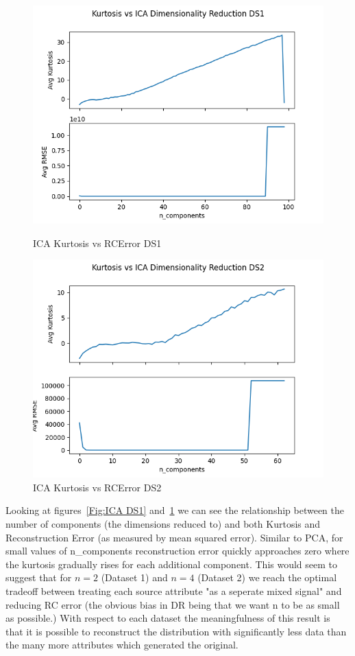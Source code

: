 \begin{figure}
    \begin{minipage}{0.5\textwidth}
        \centering
        \includegraphics[width=.9\linewidth]{icads1.png}
        \caption{ICA Kurtosis vs RCError DS1}\label{Fig:ICA DS1}
    \end{minipage}\hfill
    \begin{minipage}{0.5\textwidth}
        \centering
        \includegraphics[width=.9\linewidth]{icads2.png}
        \caption{ICA Kurtosis vs RCError DS2}\label{Fig:ICA DS2}
    \end{minipage}
\end{figure}
Looking at figures~\ref{Fig:ICA DS1} and~\ref{Fig:ICA DS2} we can see the relationship between the number of components (the dimensions reduced to)
and both Kurtosis and Reconstruction Error (as measured by mean squared error).
Similar to PCA, for small values of n\_components reconstruction error quickly approaches zero where the kurtosis gradually
rises for each additional component.
This would seem to suggest that for $n=2$ (Dataset 1) and $n=4$ (Dataset 2) we reach the optimal tradeoff between treating
each source attribute "as a seperate mixed signal" and reducing RC error (the obvious bias in DR being that we want n to be as
small as possible.)
With respect to each dataset the meaningfulness of this result is that it is possible to reconstruct the distribution with
significantly less data than the many more attributes which generated the original.


